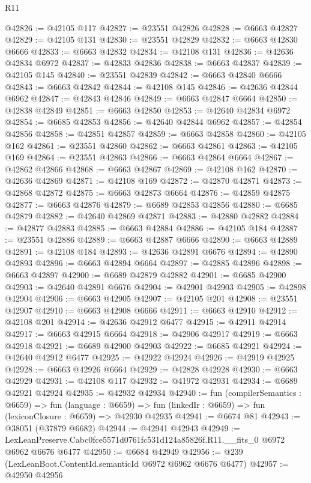 \begin{lexlean}{R11}
\begin{coremodule}
@42826 := @42105 @117
@42827 := @23551 @42826
@42828 := @6663 @42827
@42829 := @42105 @131
@42830 := @23551 @42829
@42832 := @6663 @42830 @6666
@42833 := @6663 @42832
@42834 := @42108 @131
@42836 := @42636 @42834 @6972
@42837 := @42833 @42836
@42838 := @6663 @42837
@42839 := @42105 @145
@42840 := @23551 @42839
@42842 := @6663 @42840 @6666
@42843 := @6663 @42842
@42844 := @42108 @145
@42846 := @42636 @42844 @6962
@42847 := @42843 @42846
@42849 := @6663 @42847 @6664
@42850 := @42838 @42849
@42851 := @6663 @42850
@42853 := @42640 @42834 @6972
@42854 := @6685 @42853
@42856 := @42640 @42844 @6962
@42857 := @42854 @42856
@42858 := @42851 @42857
@42859 := @6663 @42858
@42860 := @42105 @162
@42861 := @23551 @42860
@42862 := @6663 @42861
@42863 := @42105 @169
@42864 := @23551 @42863
@42866 := @6663 @42864 @6664
@42867 := @42862 @42866
@42868 := @6663 @42867
@42869 := @42108 @162
@42870 := @42636 @42869
@42871 := @42108 @169
@42872 := @42870 @42871
@42873 := @42868 @42872
@42875 := @6663 @42873 @6664
@42876 := @42859 @42875
@42877 := @6663 @42876
@42879 := @6689 @42853 @42856
@42880 := @6685 @42879
@42882 := @42640 @42869 @42871
@42883 := @42880 @42882
@42884 := @42877 @42883
@42885 := @6663 @42884
@42886 := @42105 @184
@42887 := @23551 @42886
@42889 := @6663 @42887 @6666
@42890 := @6663 @42889
@42891 := @42108 @184
@42893 := @42636 @42891 @6676
@42894 := @42890 @42893
@42896 := @6663 @42894 @6664
@42897 := @42885 @42896
@42898 := @6663 @42897
@42900 := @6689 @42879 @42882
@42901 := @6685 @42900
@42903 := @42640 @42891 @6676
@42904 := @42901 @42903
@42905 := @42898 @42904
@42906 := @6663 @42905
@42907 := @42105 @201
@42908 := @23551 @42907
@42910 := @6663 @42908 @6666
@42911 := @6663 @42910
@42912 := @42108 @201
@42914 := @42636 @42912 @6477
@42915 := @42911 @42914
@42917 := @6663 @42915 @6664
@42918 := @42906 @42917
@42919 := @6663 @42918
@42921 := @6689 @42900 @42903
@42922 := @6685 @42921
@42924 := @42640 @42912 @6477
@42925 := @42922 @42924
@42926 := @42919 @42925
@42928 := @6663 @42926 @6664
@42929 := @42828 @42928
@42930 := @6663 @42929
@42931 := @42108 @117
@42932 := @41972 @42931
@42934 := @6689 @42921 @42924
@42935 := @42932 @42934
@42940 := fun (compilerSemantics : @6659) =>
  fun (language : @6659) => fun (linkedIr : @6659) => fun (lexiconClosure : @6659) => @42930 @42935
@42941 := @6674 @81
@42943 := @38051 (@37879 @6682)
@42944 := @42941 @42943
@42949 := LexLeanPreserve.Cabc0fce5571d0761fc531d124a85826f.R11.__fits_0 @6972 @6962 @6676 @6477
@42950 := @6684 @42949
@42956 := @239 (LexLeanBoot.ContentId.semanticId @6972 @6962 @6676 @6477)
@42957 := @42950 @42956

\end{coremodule}
\end{lexlean}
